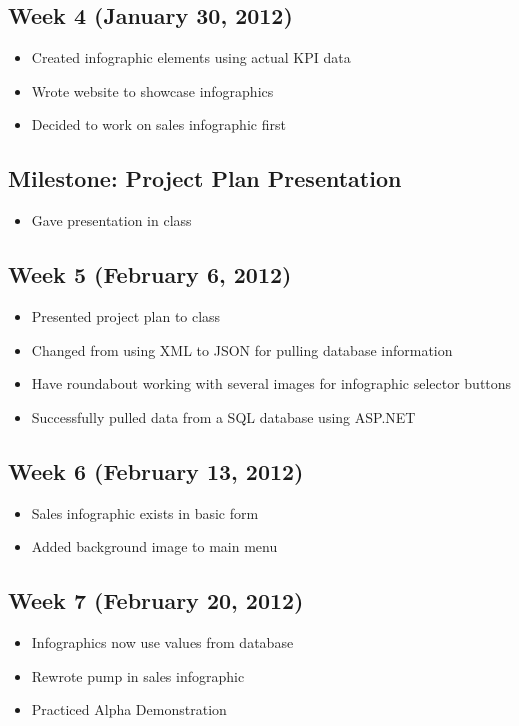 \documentclass[11pt,a4paper,oneside]{article}
\begin{document}
\subsection{Week 4 (January 30, 2012)}
\begin{itemize}
\item Created infographic elements using actual KPI data
\item Wrote website to showcase infographics
\item Decided to work on sales infographic first
\end{itemize}

\subsection{Milestone: Project Plan Presentation}
\begin{itemize}
\item Gave presentation in class
\end{itemize}

\subsection{Week 5 (February 6, 2012)}
\begin{itemize}
\item Presented project plan to class
\item Changed from using XML to JSON for pulling database information
\item Have roundabout working with several images for infographic selector buttons
\item Successfully pulled data from a SQL database using ASP.NET
\end{itemize}

\subsection{Week 6 (February 13, 2012)}
\begin{itemize}
\item Sales infographic exists in basic form
\item Added background image to main menu
\end{itemize}

\subsection{Week 7 (February 20, 2012)}
\begin{itemize}
\item Infographics now use values from database
\item Rewrote pump in sales infographic
\item Practiced Alpha Demonstration
\end{itemize}
\end{document}
